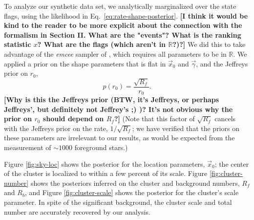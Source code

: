 \documentclass[aps,prd]{revtex4-1}
\newcommand{\ilya}[1]{{\color{red} \bf #1}}
\begin{document}
To analyze our synthetic data set, we analytically marginalized over
the state flags, using the likelihood in Eq.~\eqref{eq:rate-shape-posterior}.
\ilya{[I think it would be kind to the reader to be more explicit
    about the connection with the formalism in Section II.  What are
    the "events"?  What is the ranking statistic $x$?  What are the
    flags (which aren't in $\mathbb{R}$?)?]}  We did this to take
advantage of the \textit{emcee} sampler of \citet{ForemanMackey2012},
which requires all parameters to be in $\mathbb{R}$.  We applied a
prior on the shape parameters that is flat in $\vec{x}_0$ and
$\vec{\gamma}$, and the Jeffreys prior on $r_0$,
\begin{equation}
  p\left( r_0 \right) = \frac{\sqrt{R_f}}{r_0}.
\end{equation}
\ilya{[Why is this the Jeffreys prior (BTW, it's Jeffreys, or perhaps
    Jeffreys', but definitely not Jeffrey's ;) )?  It's not obvious
    why the prior on $r_0$ should depend on $R_f$?]}  (Note that this
factor of $\sqrt{R_f}$ cancels with the Jeffreys prior on the rate,
$1/\sqrt{R_f}$; we have verified that the priors on these parameters
are irrelevant to our results, as would be expected from the
measurement of $\sim 1000$ foreground stars.)

Figure \ref{fig:sky-loc} shows the posterior for the location
parameters, $\vec{x}_0$; the center of the cluster is localized to
within a few percent of its scale.  Figure \ref{fig:cluster-number}
shows the posteriors inferred on the cluster and background numbers,
$R_f$ and $R_b$, and Figure \ref{fig:cluster-scale} shows the
posterior for the cluster's scale parameter.  In spite of the
significant background, the cluster scale and total number are
accurately recovered by our analysis.
\end{document}

